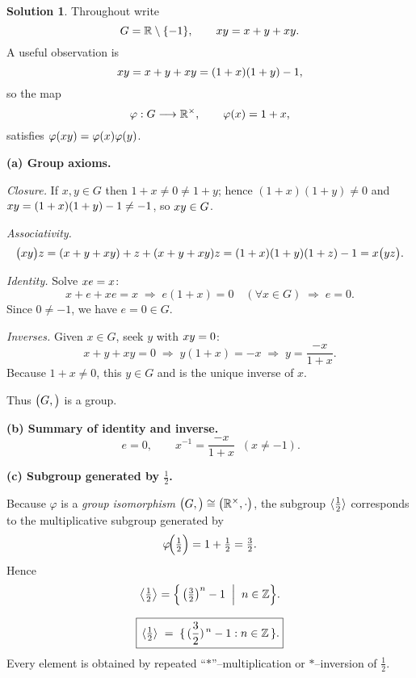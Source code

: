 \documentclass[12pt]{article}
\theoremstyle{definition} %
\newtheorem{solution}{Solution}
\theoremstyle{plain} %
\begin{document}
  \begin{solution}
  Throughout write
  \[
     G=\Bbb R\setminus\{-1\},
     \qquad
     x\*y = x+y+xy.
  \]
  A useful observation is
  \[
     x\*y
       = x+y+xy
       = (1+x)(1+y)-1,
  \]
  so the map
  \[
     \varphi:G\longrightarrow\Bbb R^{\times},
     \qquad
     \varphi(x)=1+x,
  \]
  satisfies
  \(\varphi(x\*y)=\varphi(x)\varphi(y)\).
  
  \bigskip
  \textbf{(a)  Group axioms.}
  
  \emph{Closure.}
  If \(x,y\in G\) then \(1+x\neq0\neq1+y\); hence
  \((1+x)(1+y)\neq0\) and \(x\*y=(1+x)(1+y)-1\neq-1\), so \(x\*y\in G\).
  
  \emph{Associativity.}
  \[
  \bigl(x\*y\bigr)\*z
     =(x+y+xy)+z+(x+y+xy)z
     =(1+x)(1+y)(1+z)-1
     =x\*\bigl(y\*z\bigr).
  \]
  
  \emph{Identity.}
  Solve \(x\*e=x\):
  \[
     x+e+xe=x
     \;\Longrightarrow\;
     e(1+x)=0\quad(\forall x\in G)\;\Longrightarrow\; e=0.
  \]
  Since \(0\neq-1\), we have \(e=0\in G\).
  
  \emph{Inverses.}
  Given \(x\in G\), seek \(y\) with \(x\*y=0\):
  \[
     x+y+xy=0
     \;\Longrightarrow\;
     y(1+x)=-x
     \;\Longrightarrow\;
     y=\frac{-x}{1+x}.
  \]
  Because \(1+x\neq0\), this \(y\in G\) and is the unique inverse of \(x\).
  
  Thus \(\bigl(G,\*\bigr)\) is a group.
  
  \bigskip
  \textbf{(b)  Summary of identity and inverse.}
  \[
     \boxed{\,e=0,\qquad
            x^{-1}= \dfrac{-x}{1+x}\;\;(x\neq-1).}
  \]
  
  \bigskip
  \textbf{(c)  Subgroup generated by \(\tfrac12\).}
  
  Because \(\varphi\) is a \emph{group isomorphism}
  \(\bigl(G,\*\bigr)\cong\bigl(\Bbb R^{\times},\cdot\bigr)\),
  the subgroup
  \(\langle\tfrac12\rangle_{\*}\) corresponds to the multiplicative
  subgroup generated by
  \[
     \varphi\!\Bigl(\tfrac12\Bigr)=1+\tfrac12=\tfrac32 .
  \]
  Hence
  \[
     \bigl\langle\tfrac12\bigr\rangle_{\*}
        = \Bigl\{\,\bigl(\tfrac32\bigr)^{n}-1\;\Bigm|\;n\in\Bbb Z\Bigr\}.
  \]
  
  \[
     \boxed{\,\langle\tfrac12\rangle_{\*}
        \;=\;\{\,(\frac32)^{\,n}-1 : n\in\Bbb Z\,\}.}
  \]
  Every element is obtained by repeated “\(*\)”–multiplication or
  \(*\)–inversion of \(\tfrac12\).
  \end{solution}
\end{document}
